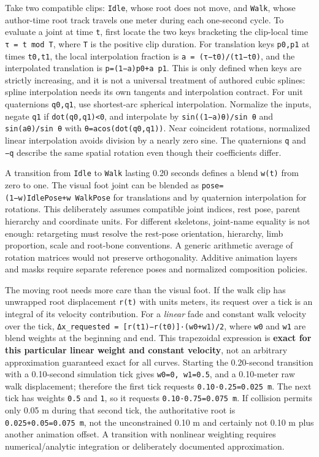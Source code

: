Take two compatible clips: \texttt{Idle}, whose root does not move, and \texttt{Walk}, whose author-time root track travels one meter during each one-second cycle. To evaluate a joint at time \texttt{t}, first locate the two keys bracketing the clip-local time \texttt{τ\ =\ t\ mod\ T}, where \texttt{T} is the positive clip duration. For translation keys \texttt{p0,p1} at times \texttt{t0,t1}, the local interpolation fraction is \texttt{a\ =\ (τ−t0)/(t1−t0)}, and the interpolated translation is \texttt{p=(1−a)p0+a\ p1}. This is only defined when keys are strictly increasing, and it is not a universal treatment of authored cubic splines: spline interpolation needs its own tangents and interpolation contract. For unit quaternions \texttt{q0,q1}, use shortest-arc spherical interpolation. Normalize the inputs, negate \texttt{q1} if \texttt{dot(q0,q1)\textless{}0}, and interpolate by \texttt{sin((1−a)θ)/sin\ θ} and \texttt{sin(aθ)/sin\ θ} with \texttt{θ=acos(dot(q0,q1))}. Near coincident rotations, normalized linear interpolation avoids division by a nearly zero sine. The quaternions \texttt{q} and \texttt{−q} describe the same spatial rotation even though their coefficients differ.

A transition from \texttt{Idle} to \texttt{Walk} lasting 0.20 seconds defines a blend \texttt{w(t)} from zero to one. The visual foot joint can be blended as \texttt{pose=(1−w)IdlePose+w\ WalkPose} for translations and by quaternion interpolation for rotations. This deliberately assumes compatible joint indices, rest pose, parent hierarchy and coordinate units. For different skeletons, joint-name equality is not enough: retargeting must resolve the rest-pose orientation, hierarchy, limb proportion, scale and root-bone conventions. A generic arithmetic average of rotation matrices would not preserve orthogonality. Additive animation layers and masks require separate reference poses and normalized composition policies.

The moving root needs more care than the visual foot. If the walk clip has unwrapped root displacement \texttt{r(t)} with units meters, its request over a tick is an integral of its velocity contribution. For a \emph{linear} fade and constant walk velocity over the tick, \texttt{Δx\_requested\ =\ {[}r(t1)−r(t0){]}·(w0+w1)/2}, where \texttt{w0} and \texttt{w1} are blend weights at the beginning and end. This trapezoidal expression is \textbf{exact for this particular linear weight and constant velocity}, not an arbitrary approximation guaranteed exact for all curves. Starting the 0.20-second transition with a 0.10-second simulation tick gives \texttt{w0=0,\ w1=0.5}, and a 0.10-meter raw walk displacement; therefore the first tick requests \texttt{0.10·0.25=0.025\ m}. The next tick has weights \texttt{0.5} and \texttt{1}, so it requests \texttt{0.10·0.75=0.075\ m}. If collision permits only 0.05 m during that second tick, the authoritative root is \texttt{0.025+0.05=0.075\ m}, not the unconstrained 0.10 m and certainly not 0.10 m plus another animation offset. A transition with nonlinear weighting requires numerical/analytic integration or deliberately documented approximation.


